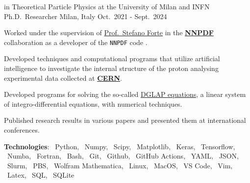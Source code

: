 \begin{cventries}
    \cventry
    {in Theoretical Particle Physics at the University of Milan and INFN}
    {Ph.D.\ Researcher}
    {Milan, Italy}
    {Oct.\ 2021 - Sept.\ 2024}
    {
        \begin{cvitems} %
            \item Worked under the supervision of \href{https://inspirehep.net/authors/1009661?ui-citation-summary=true}{Prof.\ Stefano Forte} in the \href{https://nnpdf.mi.infn.it}{\textbf{NNPDF}} collaboration 
            as a developer of the \texttt{NNPDF} code \href{https://github.com/NNPDF}{\githublogo}.
            \item Developed techniques and computational programs that utilize artificial intelligence to 
            investigate the internal structure of the proton analysing experimental data collected at \href{https://home.cern}{\textbf{CERN}}.
            \item Developed programs for solving the so-called \href{https://eko.readthedocs.io/en/latest/theory/DGLAP.html}{DGLAP equations}, a linear system of integro-differential equations, with numerical techniques.
            \item Published research results in various papers and presented them at international conferences.
            \item[] \textbf{\textcolor{awesome}{Tec}hnologies}: \pythonlogo{}~Python, \numpylogo{}~Numpy, \scipylogo{}~Scipy, \matplotliblogo{}~Matplotlib{}, \keraslogo{}~Keras, \tensorflowlogo{}~Tensorflow, \numbalogo{}~Numba, \fortranlogo{}~Fortran, \bashlogo{}~Bash, \gitlogo{}~Git, \githublogo{}~Github, \githubactionslogo{}~GitHub Actions, \yamllogo{}~YAML, \jsonlogo{}~JSON, \slurmlogo{}~Slurm, \pbslogo{}~PBS, \mathematicalogo{}~Wolfram Mathematica, \linuxlogo{}~Linux, \faApple{}~MacOS, \vscodelogo{}~VS Code, \vimlogo{}~Vim, \latexlogo{}~Latex, \SQLlogo{}~SQL, \sqlitelogo{}~SQLite
        \end{cvitems}
    }



\end{cventries}
